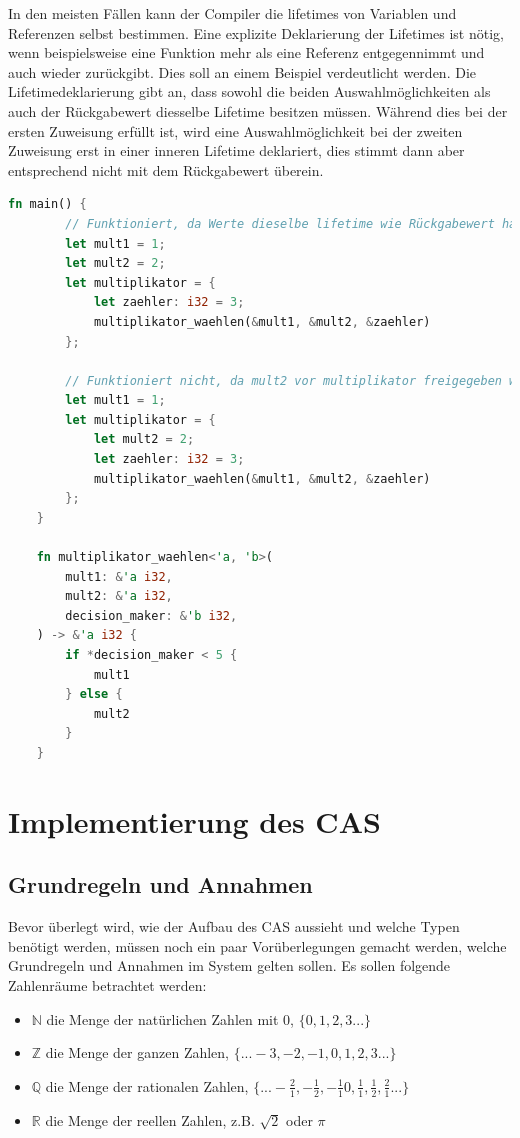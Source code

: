 \documentclass[11pt,a4paper, ngerman]{article}
\begin{document}
In den meisten Fällen kann der Compiler die lifetimes von Variablen und Referenzen selbst bestimmen. Eine explizite Deklarierung der Lifetimes ist nötig, wenn beispielsweise eine Funktion mehr als eine Referenz entgegennimmt und auch wieder zurückgibt. Dies soll an einem Beispiel verdeutlicht werden. Die Lifetimedeklarierung  gibt an, dass sowohl die beiden Auswahlmöglichkeiten als auch der Rückgabewert diesselbe Lifetime besitzen müssen. Während dies bei der ersten Zuweisung erfüllt ist, wird eine Auswahlmöglichkeit bei der zweiten Zuweisung erst in einer inneren Lifetime deklariert, dies stimmt dann aber entsprechend nicht mit dem Rückgabewert überein.

\begin{lstlisting}[language=rust, caption={lifetime Beispiele \cite{RustLifetimeEx}}]
    fn main() {
        // Funktioniert, da Werte dieselbe lifetime wie Rückgabewert haben
        let mult1 = 1;
        let mult2 = 2;
        let multiplikator = {
            let zaehler: i32 = 3;
            multiplikator_waehlen(&mult1, &mult2, &zaehler)
        };

        // Funktioniert nicht, da mult2 vor multiplikator freigegeben wird
        let mult1 = 1;
        let multiplikator = {
            let mult2 = 2;
            let zaehler: i32 = 3;
            multiplikator_waehlen(&mult1, &mult2, &zaehler)
        };
    }

    fn multiplikator_waehlen<'a, 'b>(
        mult1: &'a i32,
        mult2: &'a i32,
        decision_maker: &'b i32,
    ) -> &'a i32 {
        if *decision_maker < 5 {
            mult1
        } else {
            mult2
        }
    }
\end{lstlisting}

\newpage

\section{Implementierung des CAS}
\subsection{Grundregeln und Annahmen}
Bevor überlegt wird, wie der Aufbau des CAS aussieht und welche Typen benötigt werden, müssen noch ein paar Vorüberlegungen gemacht werden, welche Grundregeln und Annahmen im System gelten sollen. Es sollen folgende Zahlenräume betrachtet werden:
\begin{itemize}
    \item $\mathbb{N}$ die Menge der natürlichen Zahlen mit 0, $\{0, 1, 2, 3...\}$
    \item $\mathbb{Z}$ die Menge der ganzen Zahlen, $\{...-3, -2, -1, 0, 1, 2, 3...\}$
    \item $\mathbb{Q}$ die Menge der rationalen Zahlen, $\{...-\frac{2}{1}, -\frac{1}{2}, -\frac{1}{1} 0, \frac{1}{1}, \frac{1}{2}, \frac{2}{1}...\}$
    \item $\mathbb{R}$ die Menge der reellen Zahlen, z.B. $\sqrt{2}$ oder $\pi$
\end{itemize}
\end{document}
